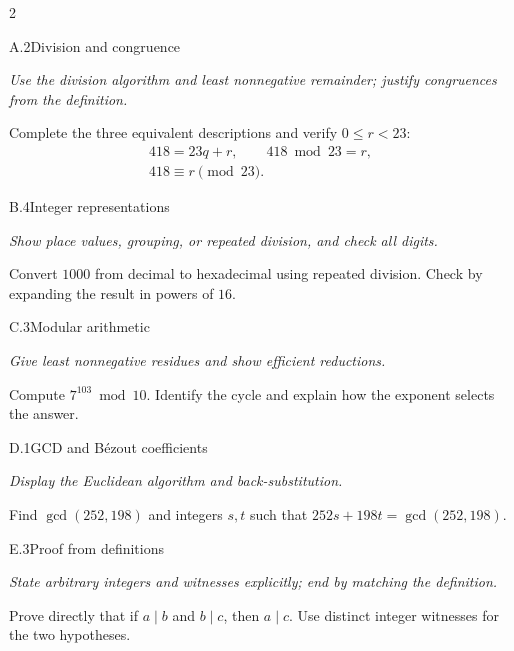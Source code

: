 \documentclass[9pt]{extarticle}
\begin{document}
\begin{multicols}{2}
\begin{CoreProblem}{A.2}{Division and congruence}
{\scriptsize\textit{Use the division algorithm and least nonnegative remainder; justify congruences from the definition.}\par}
Complete the three equivalent descriptions and verify $0\le r<23$:
\[
\begin{gathered}
418=23q+r,\qquad 418\bmod 23=r,\\
418\equiv r\pmod{23}.
\end{gathered}
\]
\end{CoreProblem}
\begin{CoreProblem}{B.4}{Integer representations}
{\scriptsize\textit{Show place values, grouping, or repeated division, and check all digits.}\par}
Convert $1000$ from decimal to hexadecimal using repeated division. Check by
expanding the result in powers of $16$.
\end{CoreProblem}
\begin{CoreProblem}{C.3}{Modular arithmetic}
{\scriptsize\textit{Give least nonnegative residues and show efficient reductions.}\par}
Compute $7^{103}\bmod10$. Identify the cycle and explain how the exponent
selects the answer.
\end{CoreProblem}
\columnbreak
\begin{CoreProblem}{D.1}{GCD and B\'ezout coefficients}
{\scriptsize\textit{Display the Euclidean algorithm and back-substitution.}\par}
Find $\gcd(252,198)$ and integers $s,t$ such that
$252s+198t=\gcd(252,198)$.
\end{CoreProblem}
\begin{CoreProblem}{E.3}{Proof from definitions}
{\scriptsize\textit{State arbitrary integers and witnesses explicitly; end by matching the definition.}\par}
Prove directly that if $a\mid b$ and $b\mid c$, then $a\mid c$. Use distinct
integer witnesses for the two hypotheses.
\end{CoreProblem}
\end{multicols}
\CoreWorkArea
\FormBreak
{}
\end{document}
